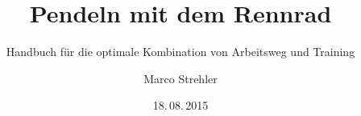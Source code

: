 \documentclass[a4paper,DIV13,BCOR1cm]{scrbook}
\begin{document}

\title{Pendeln mit dem Rennrad}
\subtitle{Handbuch für die optimale Kombination von Arbeitsweg und Training}  
\author{Marco Strehler}
\date{18.\,08.\,2015}
\dedication{Harden The Fuck Up.\\
        Velominati, Rule \#5}
\frontmatter
\maketitle



\tableofcontents

\mainmatter











\backmatter



\end{document}
